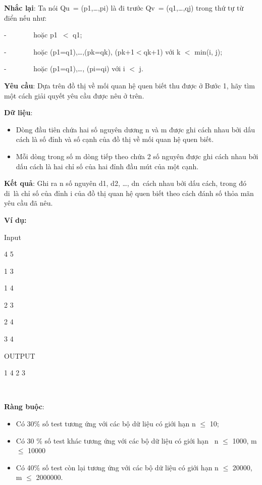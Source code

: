 \textbf{Nhắc lại}: Ta nói Qu = (p1,…,pi) là đi trước Qv = (q1,…,qj) trong thứ tự từ điển nếu như:

-        hoặc p1 $<$ q1;

-        hoặc (p1=q1),…,(pk=qk), (pk+1$<$qk+1) với k $<$ min(i, j);

-        hoặc (p1=q1),…, (pi=qi) với i $<$ j.

\textbf{Yêu cầu}: Dựa trên đồ thị về mối quan hệ quen biết thu được ở Bước 1, hãy tìm một cách giải quyết yêu cầu được nêu ở trên.

\textbf{Dữ liệu}:
\begin{itemize}
	\item Dòng đầu tiên chứa hai số nguyên dương n và m được ghi cách nhau bởi dấu cách là số đỉnh và số cạnh của đồ thị về mối quan hệ quen biết.
	\item Mỗi dòng trong số m dòng tiếp theo chứa 2 số nguyên được ghi cách nhau bởi dấu cách là hai chỉ số của hai đỉnh đầu mút của một cạnh.
\end{itemize}

\textbf{Kết quả}: Ghi ra n số nguyên d1, d2, …, dn cách nhau bởi dấu cách, trong đó di là chỉ số của đỉnh i của đồ thị quan hệ quen biết theo cách đánh số thỏa mãn yêu cầu đã nêu.

\textbf{Ví dụ:}

Input

4 5

1 3

1 4

2 3

2 4

3 4

OUTPUT

1 4 2 3

 

\textbf{Ràng buộc}:
\begin{itemize}
	\item Có 30\% số test tương ứng với các bộ dữ liệu có giới hạn n  $\le$  10;
	\item Có 30 \% số test khác tương ứng với các bộ dữ liệu có giới hạn  n  $\le$  1000, m  $\le$  10000
	\item Có 40\% số test còn lại tương ứng với các bộ dữ liệu có giới hạn n  $\le$  20000, m  $\le$  2000000.
\end{itemize}

 
